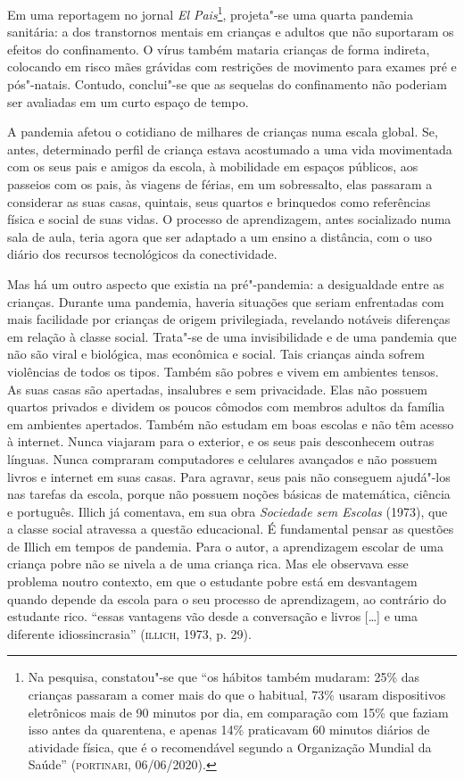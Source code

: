 Em uma reportagem no jornal \emph{El Pais}\footnote{Na pesquisa,
  constatou"-se que ``os hábitos também mudaram: 25\% das crianças
  passaram a comer mais do que o habitual, 73\% usaram dispositivos
  eletrônicos mais de 90 minutos por dia, em comparação com 15\% que
  faziam isso antes da quarentena, e apenas 14\% praticavam 60 minutos
  diários de atividade física, que é o recomendável segundo a
  Organização Mundial da Saúde'' (\textsc{portinari}, 06/06/2020).}, projeta"-se
uma quarta pandemia sanitária: a dos transtornos mentais em crianças e
adultos que não suportaram os efeitos do confinamento. O vírus também
mataria crianças de forma indireta, colocando em risco mães grávidas com
restrições de movimento para exames pré e pós"-natais. Contudo,
conclui"-se que as sequelas do confinamento não poderiam ser avaliadas em
um curto espaço de tempo.

A pandemia afetou o cotidiano de milhares de crianças numa escala
global. Se, antes, determinado perfil de criança estava acostumado a uma
vida movimentada com os seus pais e amigos da escola, à mobilidade em
espaços públicos, aos passeios com os pais, às viagens de férias, em um
sobressalto, elas passaram a considerar as suas casas, quintais, seus
quartos e brinquedos como referências física e social de suas vidas. O
processo de aprendizagem, antes socializado numa sala de aula, teria
agora que ser adaptado a um ensino a distância, com o uso diário dos
recursos tecnológicos da conectividade.

Mas há um outro aspecto que existia na pré"-pandemia: a desigualdade
entre as crianças. Durante uma pandemia, haveria situações que seriam
enfrentadas com mais facilidade por crianças de origem privilegiada,
revelando notáveis diferenças em relação à classe social. Trata"-se de
uma invisibilidade e de uma pandemia que não são viral e biológica, mas
econômica e social. Tais crianças ainda sofrem violências de todos os
tipos. Também são pobres e vivem em ambientes tensos. As suas casas são
apertadas, insalubres e sem privacidade. Elas não possuem quartos
privados e dividem os poucos cômodos com membros adultos da família em
ambientes apertados. Também não estudam em boas escolas e não têm acesso
à internet. Nunca viajaram para o exterior, e os seus pais desconhecem
outras línguas. Nunca compraram computadores e celulares avançados e não
possuem livros e internet em suas casas. Para agravar, seus pais não
conseguem ajudá"-los nas tarefas da escola, porque não possuem noções
básicas de matemática, ciência e português. Illich já comentava, em sua
obra \emph{Sociedade sem Escolas} (1973), que a classe social atravessa
a questão educacional. É fundamental pensar as questões de Illich em
tempos de pandemia. Para o autor, a aprendizagem escolar de uma criança
pobre não se nivela a de uma criança rica. Mas ele observava esse
problema noutro contexto, em que o estudante pobre está em desvantagem
quando depende da escola para o seu processo de aprendizagem, ao
contrário do estudante rico. ``essas vantagens vão desde a conversação e
livros {[}\ldots{}{]} e uma diferente idiossincrasia'' (\textsc{illich}, 1973, p. 29).

